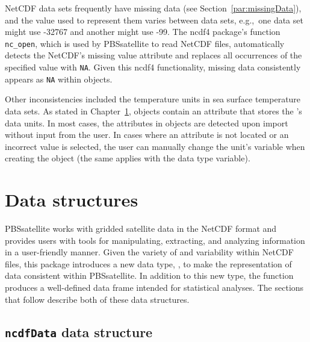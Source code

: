 \documentclass[11pt]{report}
\begin{document}
NetCDF data sets frequently have missing data (see Section~\ref{par:missingData}), and the value used to represent them varies between data sets, e.g.,~one data set might use -32767 and another might use -99.
The ncdf4 package's function \texttt{nc\_open}, which is used by PBSsatellite to read NetCDF files, automatically detects the NetCDF's missing value attribute and replaces all occurrences of the specified value with \lstinline{NA}.
Given this ncdf4 functionality, missing data consistently appears as \lstinline{NA} within  objects.

Other inconsistencies included the temperature units in sea surface temperature data sets.
As stated in Chapter~\ref{c:DataStructures},  objects contain an attribute that stores the 's data units.
In most cases, the attributes in  objects are detected upon import without input from the user.
In cases where an attribute is not located or an incorrect value is selected, the user can manually change the unit's variable when creating the  object (the same applies with the data type variable).   

\chapter{Data structures}
\label{c:DataStructures}

PBSsatellite works with gridded satellite data in the NetCDF format and provides users with tools for manipulating, extracting, and analyzing information in a user-friendly manner. 
Given the variety of and variability within NetCDF files, this package introduces a new data type, , to make the representation of data consistent within PBSsatellite.
In addition to this new type, the  function produces a well-defined data frame intended for statistical analyses.
The sections that follow describe both of these data structures.

\section{\texttt{ncdfData} data structure}
\label{s:ncdfData}
\end{document}
